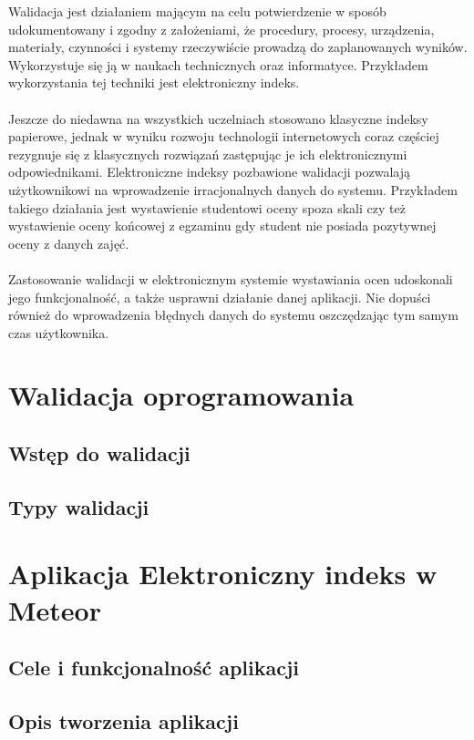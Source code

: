 \documentclass[brudnopis]{xmgr}
\begin{document}
Walidacja jest działaniem mającym na celu potwierdzenie w sposób udokumentowany i zgodny
z założeniami, że procedury, procesy, urządzenia, materiały, czynności i systemy rzeczywiście
prowadzą do zaplanowanych wyników. Wykorzystuje się ją w naukach technicznych oraz informatyce.
Przykładem wykorzystania tej techniki jest elektroniczny indeks.
\\
\\
Jeszcze do niedawna na wszystkich uczelniach stosowano klasyczne indeksy papierowe,
jednak w wyniku rozwoju technologii internetowych coraz częściej rezygnuje się z klasycznych
rozwiązań zastępując je ich elektronicznymi odpowiednikami. Elektroniczne indeksy pozbawione
walidacji pozwalają użytkownikowi na wprowadzenie irracjonalnych danych do systemu.
Przykładem takiego działania jest wystawienie studentowi oceny spoza skali czy też wystawienie
oceny końcowej z egzaminu gdy student nie posiada pozytywnej oceny z danych zajęć.
\\
\\
Zastosowanie walidacji w elektronicznym systemie wystawiania ocen udoskonali jego funkcjonalność,
a także usprawni działanie danej aplikacji. Nie dopuści również do wprowadzenia błędnych danych do systemu
oszczędzając tym samym czas użytkownika.




\chapter{Walidacja oprogramowania}

\section{Wstęp do walidacji}
\section{Typy walidacji}

\chapter{Aplikacja Elektroniczny indeks w Meteor}

\section{Cele i funkcjonalność aplikacji}
\section{Opis tworzenia aplikacji}
\end{document}
